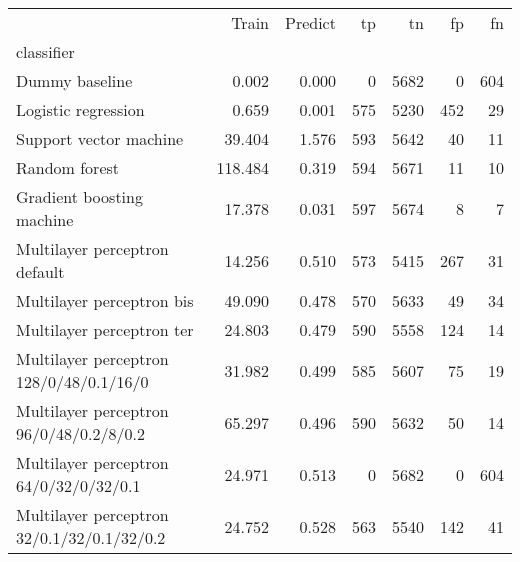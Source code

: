 \begin{tabular}{lrrrrrr}
\toprule
 & Train & Predict & tp & tn & fp & fn \\
classifier &  &  &  &  &  &  \\
\midrule
Dummy baseline & 0.002 & 0.000 & 0 & 5682 & 0 & 604 \\
Logistic regression & 0.659 & 0.001 & 575 & 5230 & 452 & 29 \\
Support vector machine & 39.404 & 1.576 & 593 & 5642 & 40 & 11 \\
Random forest & 118.484 & 0.319 & 594 & 5671 & 11 & 10 \\
Gradient boosting machine & 17.378 & 0.031 & 597 & 5674 & 8 & 7 \\
Multilayer perceptron default & 14.256 & 0.510 & 573 & 5415 & 267 & 31 \\
Multilayer perceptron bis & 49.090 & 0.478 & 570 & 5633 & 49 & 34 \\
Multilayer perceptron ter & 24.803 & 0.479 & 590 & 5558 & 124 & 14 \\
Multilayer perceptron 128/0/48/0.1/16/0 & 31.982 & 0.499 & 585 & 5607 & 75 & 19 \\
Multilayer perceptron 96/0/48/0.2/8/0.2 & 65.297 & 0.496 & 590 & 5632 & 50 & 14 \\
Multilayer perceptron 64/0/32/0/32/0.1 & 24.971 & 0.513 & 0 & 5682 & 0 & 604 \\
Multilayer perceptron 32/0.1/32/0.1/32/0.2 & 24.752 & 0.528 & 563 & 5540 & 142 & 41 \\
\bottomrule
\end{tabular}

